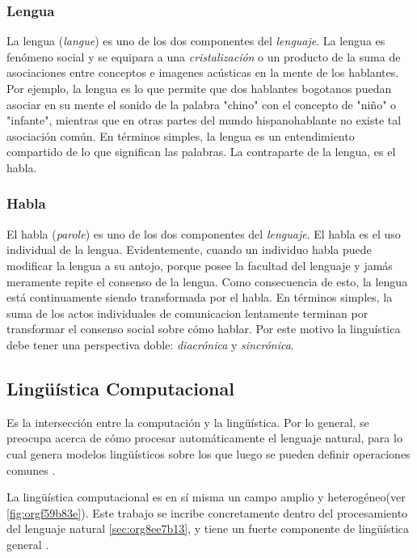 \documentclass[12pt,letterpaper,twoside]{article}
\begin{document}
\subsubsection{Lengua}
\label{sec:org3d0dfc3}

La lengua (\emph{langue}) es uno de los dos componentes del
\emph{lenguaje}.  La lengua es fenómeno social y se equipara a una
\emph{cristalización} o un producto de la suma de asociaciones entre
conceptos e imagenes acústicas en la mente de los hablantes. Por
ejemplo, la lengua es lo que permite que dos hablantes bogotanos
puedan asociar en su mente el sonido de la palabra "chino" con el
concepto de "niño" o "infante", mientras que en otras partes del
mundo hispanohablante no existe tal asociación común.
En términos simples, la lengua es un entendimiento compartido de
lo que significan las palabras. La contraparte de la lengua,
es el habla. 

\subsubsection{Habla}
\label{sec:org8b1543b}
El habla (\emph{parole}) es uno de los dos componentes del
\emph{lenguaje}. El habla es el uso individual de la lengua.
Evidentemente, cuando un individuo habla puede modificar
la lengua a su antojo, porque posee la facultad del
lenguaje y jamás meramente repite el consenso de la lengua.
Como consecuencia de esto, la lengua está continuamente
siendo transformada por el habla. En términos simples,
la suma de los actos individuales de comunicacion lentamente
terminan por transformar el consenso social sobre cómo
hablar.  Por este motivo la linguística debe tener una
perspectiva doble: \emph{diacrónica} y \emph{sincrónica}.


\subsection{Lingüística Computacional}
\label{sec:org3579067}

Es la intersección entre la computación y la lingüística. Por lo
general, se preocupa acerca de cómo procesar automáticamente el
lenguaje natural, para lo cual genera modelos lingüísticos sobre los
que luego se pueden definir operaciones comunes \cite{gelbukh2004}.


La lingüística computacional es en sí misma un campo amplio y
heterogéneo(ver \ref{fig:orgf59b83e}).
Este trabajo se incribe concretamente dentro del procesamiento
del lenguaje natural \ref{sec:org8ee7b13}, y tiene un fuerte componente de
lingüística general .
\end{document}
